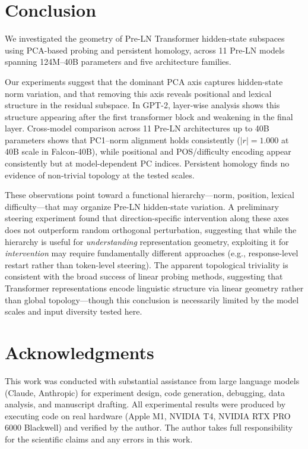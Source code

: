 \documentclass[11pt,a4paper]{article}
\begin{document}
\section{Conclusion}

We investigated the geometry of Pre-LN Transformer hidden-state subspaces using PCA-based probing and persistent homology, across 11 Pre-LN models spanning 124M--40B parameters and five architecture families.

Our experiments suggest that the dominant PCA axis captures hidden-state norm variation, and that removing this axis reveals positional and lexical structure in the residual subspace. In GPT-2, layer-wise analysis shows this structure appearing after the first transformer block and weakening in the final layer. Cross-model comparison across 11 Pre-LN architectures up to 40B parameters shows that PC1--norm alignment holds consistently ($|r| = 1.000$ at 40B scale in Falcon-40B), while positional and POS/difficulty encoding appear consistently but at model-dependent PC indices. Persistent homology finds no evidence of non-trivial topology at the tested scales.

These observations point toward a functional hierarchy---norm, position, lexical difficulty---that may organize Pre-LN hidden-state variation. A preliminary steering experiment found that direction-specific intervention along these axes does not outperform random orthogonal perturbation, suggesting that while the hierarchy is useful for \emph{understanding} representation geometry, exploiting it for \emph{intervention} may require fundamentally different approaches (e.g., response-level restart rather than token-level steering). The apparent topological triviality is consistent with the broad success of linear probing methods, suggesting that Transformer representations encode linguistic structure via linear geometry rather than global topology---though this conclusion is necessarily limited by the model scales and input diversity tested here.

\section*{Acknowledgments}

This work was conducted with substantial assistance from large language models (Claude, Anthropic) for experiment design, code generation, debugging, data analysis, and manuscript drafting. All experimental results were produced by executing code on real hardware (Apple M1, NVIDIA T4, NVIDIA RTX PRO 6000 Blackwell) and verified by the author. The author takes full responsibility for the scientific claims and any errors in this work.
\end{document}
